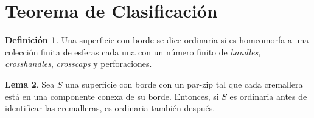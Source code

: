 \documentclass[10pt]{report}
\theoremstyle{definition}
\newtheorem{defin}{Definición}[section]
\newtheorem{lema}[defin]{Lema}
\begin{document}
\section{Teorema de Clasificación}

\begin{defin}%
Una superficie con borde se dice ordinaria si es homeomorfa a una colección finita de esferas cada una con un número finito de \textit{handles}, \textit{crosshandles}, \textit{crosscaps} y perforaciones.
\end{defin}


\begin{lema}%
Sea $S$ una superficie con borde con un par-zip tal que cada cremallera está en una componente conexa de su borde. Entonces, si $S$ es ordinaria antes de identificar las cremalleras, es ordinaria también después.\label{lema:superficie_ordinaria}
\end{lema}
\end{document}
